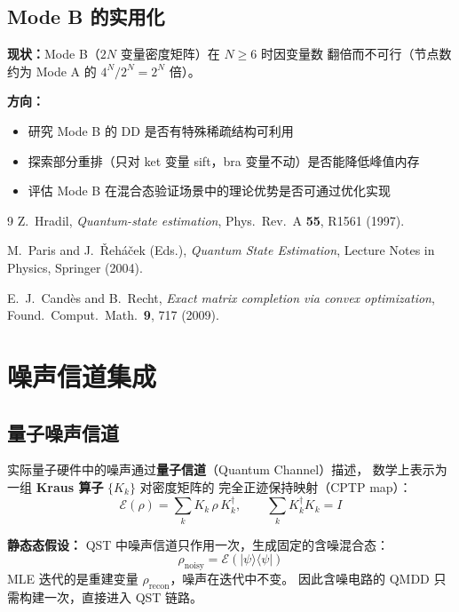 \documentclass[12pt, a4paper]{article}
\begin{document}
\subsection{Mode B 的实用化}

\textbf{现状：}Mode B（$2N$ 变量密度矩阵）在 $N \geq 6$ 时因变量数
翻倍而不可行（节点数约为 Mode A 的 $4^N / 2^N = 2^N$ 倍）。

\textbf{方向：}
\begin{itemize}
    \item 研究 Mode B 的 DD 是否有特殊稀疏结构可利用
    \item 探索部分重排（只对 ket 变量 sift，bra 变量不动）是否能降低峰值内存
    \item 评估 Mode B 在混合态验证场景中的理论优势是否可通过优化实现
\end{itemize}

\begin{thebibliography}{9}
    Z.~Hradil,
    \textit{Quantum-state estimation},
    Phys.\ Rev.\ A \textbf{55}, R1561 (1997).

    M.~Paris and J.~\v{R}eh\'{a}\v{c}ek (Eds.),
    \textit{Quantum State Estimation},
    Lecture Notes in Physics, Springer (2004).

    E.~J.~Cand\`{e}s and B.~Recht,
    \textit{Exact matrix completion via convex optimization},
    Found.\ Comput.\ Math.\ \textbf{9}, 717 (2009).
\end{thebibliography}

\appendix
\section{噪声信道集成}

\subsection{量子噪声信道}

实际量子硬件中的噪声通过\textbf{量子信道}（Quantum Channel）描述，
数学上表示为一组 \textbf{Kraus 算子} $\{K_k\}$ 对密度矩阵的
完全正迹保持映射（CPTP map）：
\[
    \mathcal{E}(\rho) = \sum_k K_k\,\rho\,K_k^\dagger,
    \qquad \sum_k K_k^\dagger K_k = I
\]

\textbf{静态态假设：} QST 中噪声信道只作用一次，生成固定的含噪混合态：
\[
    \rho_{\text{noisy}} = \mathcal{E}(|\psi\rangle\langle\psi|)
\]
MLE 迭代的是重建变量 $\rho_{\text{recon}}$，噪声在迭代中不变。
因此含噪电路的 QMDD 只需构建一次，直接进入 QST 链路。
\end{document}

